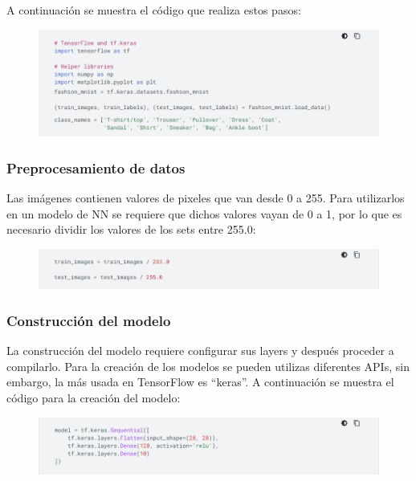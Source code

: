 \documentclass{article}
\begin{document}
A continuación se muestra el código que realiza estos pasos:

\begin{figure}[th!]
   \includegraphics[width=\textwidth]{import.png}
\end{figure}

\subsubsection{Preprocesamiento de datos}
Las imágenes contienen valores de pixeles que van desde 0 a 255. Para utilizarlos en un modelo de NN se requiere que dichos valores vayan de 0 a 1, por lo que es necesario dividir los valores de los sets entre 255.0:

\begin{figure}[th!]
   \includegraphics[width=\textwidth]{preproc.png}
\end{figure}

\subsubsection{Construcción del modelo}
La construcción del modelo requiere configurar sus layers y después proceder a compilarlo. Para la creación de los modelos se pueden utilizas diferentes APIs, sin embargo, la más usada en TensorFlow es ``keras''. A continuación se muestra el código para la creación del modelo:

\begin{figure}[th!]
   \includegraphics[width=\textwidth]{model.png}
\end{figure}
\end{document}

